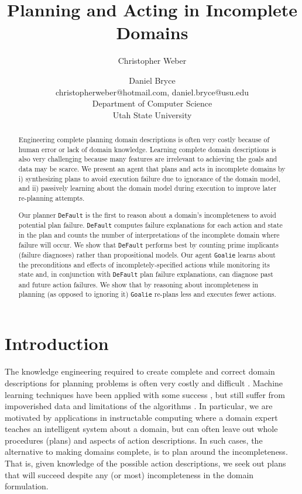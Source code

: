 \documentclass[letterpaper]{article}
\def\default{{\tt DeFault}}
\def\goalie{{\tt Goalie}}
\def\citep#1{\cite{#1}}
\begin{document}
\title{Planning and Acting in Incomplete Domains}

\author{
Christopher Weber \and Daniel Bryce\\
christopherweber@hotmail.com, daniel.bryce@usu.edu\\
Department of Computer Science\\
Utah State University
}

\maketitle

\begin{abstract}
Engineering complete planning domain descriptions is often very costly because
of human error or lack of domain knowledge. Learning complete domain
descriptions is also very challenging because many features are irrelevant to
achieving the goals and data may be scarce.  We present an agent that plans and
acts in incomplete domains by i) synthesizing plans to avoid execution failure
due to ignorance of the domain model, and ii) passively learning about the
domain model during execution to improve later re-planning attempts.

Our planner \default{} is the first to reason about a domain's incompleteness to
avoid potential plan failure.  \default{} computes failure explanations for each
action and state in the plan and counts the number of interpretations of the
incomplete domain where failure will occur. We show that \default{} performs
best by counting  prime implicants (failure diagnoses) rather than propositional
models. Our agent \goalie{} learns about the preconditions and effects of
incompletely-specified actions while monitoring its state and, in conjunction
with \default{} plan failure explanations, can diagnose past and future action
failures.   We show that by reasoning about incompleteness in planning (as
opposed to ignoring it) \goalie{} re-plans less and executes fewer actions.

\end{abstract}


\section{Introduction}
The knowledge engineering required to create complete and correct domain
descriptions for planning problems is often very costly and difficult
\citep{modellite,arms}.  Machine learning techniques have been applied with some
success \citep{arms}, but still suffer from impoverished data and limitations of
the algorithms \citep{modellite}.   In particular, we are motivated by
applications in instructable computing \citep{mable} where a domain expert
teaches an intelligent system about a domain, but can often leave out whole
procedures (plans) and aspects of action descriptions.   In such cases, the
alternative to making domains complete, is to plan around the incompleteness. 
That is, given knowledge of the possible action descriptions, we seek out plans
that will succeed despite any (or most) incompleteness in the domain
formulation.
\end{document}
